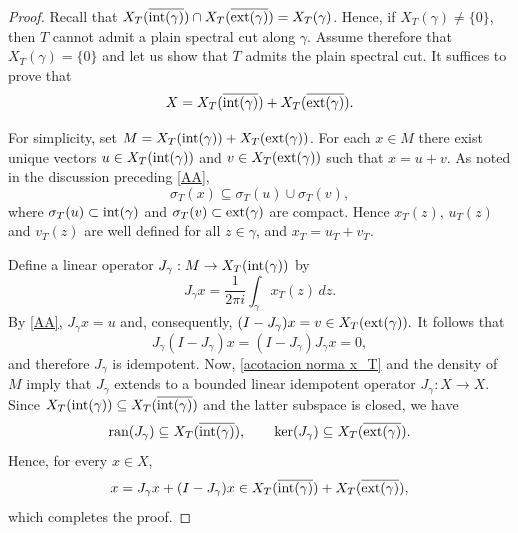 \documentclass[11pt]{amsart}
\theoremstyle{definition}
\theoremstyle{remark}
\numberwithin{equation}{section}
\newcommand{\ran}{\textnormal{ran}}
\newcommand{\Xint}{X_T(\overline{\inte(\gamma)})}
\newcommand{\Xext}{X_T(\overline{\exte(\gamma)})}
\newcommand{\inte}{\textnormal{int}}
\newcommand{\exte}{\textnormal{ext}}
\begin{document}
\begin{proof}
Recall that $\Xint \cap \Xext = X_T(\gamma)$. Hence, if $X_T(\gamma)\neq\{0\}$, then $T$ cannot admit a plain spectral cut along $\gamma$. Assume therefore that $X_T(\gamma)=\{0\}$ and let us show that $T$ admits the plain spectral cut. It suffices to prove that
$$
X = X_T(\overline{\inte(\gamma)}) + X_T(\overline{\exte(\gamma)}).
$$

For simplicity, set $M = X_T(\inte(\gamma)) + X_T(\exte(\gamma))$.  For each $x \in M$ there exist unique vectors $u \in X_T(\inte(\gamma))$ and $v \in X_T(\exte(\gamma))$ such that $x = u + v$. As noted in the discussion preceding \eqref{AA},
$$\sigma_T(x) \subseteq \sigma_T(u) \cup \sigma_T(v),$$
where $\sigma_T(u) \subset \inte(\gamma)$ and $\sigma_T(v) \subset \exte(\gamma)$ are compact. Hence $x_T(z)$, $u_T(z)$ and $v_T(z)$ are well defined for all $z \in \gamma$, and
$x_T = u_T + v_T.$

Define a linear operator $J_\gamma : M \to X_T(\inte(\gamma))$ by
\begin{equation}\label{operador J}
J_\gamma x = \frac{1}{2\pi i}\int_\gamma x_T(z)\,dz .
\end{equation}
By \eqref{AA}, $J_\gamma x = u$ and, consequently, $(I - J_\gamma)x = v \in X_T(\exte(\gamma)).$
It follows that
$$
J_\gamma(I - J_\gamma)x = (I - J_\gamma)J_\gamma x = 0,
$$
and therefore $J_\gamma$ is idempotent. Now, \eqref{acotacion norma x_T} and the density of $M$ imply that $J_\gamma$ extends to a bounded linear idempotent operator $J_\gamma : X \to X$. Since $X_T(\inte(\gamma)) \subseteq X_T(\overline{\inte(\gamma)})$ and the latter subspace is closed, we have
$$
\ran(J_\gamma) \subseteq \Xint,
\qquad
\ker(J_\gamma) \subseteq \Xext.
$$
Hence, for every $x \in X$,
$$
x = J_\gamma x + (I-J_\gamma)x \in \Xint + \Xext,
$$
which completes the proof.
\end{proof}
\end{document}
